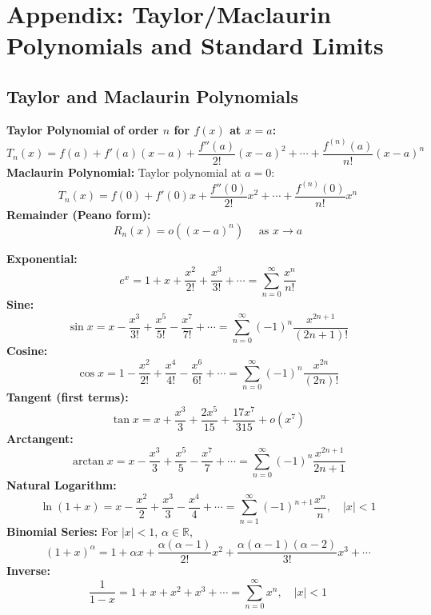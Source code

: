 \section{Appendix: Taylor/Maclaurin Polynomials and Standard Limits}

\subsection{Taylor and Maclaurin Polynomials}

\begin{cascade}
	\textbf{Taylor Polynomial of order $n$ for $f(x)$ at $x=a$:}
	\[
		T_n(x) = f(a) + f'(a)(x-a) + \frac{f''(a)}{2!}(x-a)^2 + \cdots + \frac{f^{(n)}(a)}{n!}(x-a)^n
	\]
	\textbf{Maclaurin Polynomial:} Taylor polynomial at $a=0$:
	\[
		T_n(x) = f(0) + f'(0)x + \frac{f''(0)}{2!}x^2 + \cdots + \frac{f^{(n)}(0)}{n!}x^n
	\]
	\textbf{Remainder (Peano form):}
	\[
		R_n(x) = o((x-a)^n) \quad \text{ as } x \to a
	\]

\end{cascade}

\begin{cascade}
	\textbf{Exponential:}
	\[
		e^x = 1 + x + \frac{x^2}{2!} + \frac{x^3}{3!} + \cdots = \sum_{n=0}^\infty \frac{x^n}{n!}
	\]
	\textbf{Sine:}
	\[
		\sin x = x - \frac{x^3}{3!} + \frac{x^5}{5!} - \frac{x^7}{7!} + \cdots = \sum_{n=0}^\infty (-1)^n \frac{x^{2n+1}}{(2n+1)!}
	\]
	\textbf{Cosine:}
	\[
		\cos x = 1 - \frac{x^2}{2!} + \frac{x^4}{4!} - \frac{x^6}{6!} + \cdots = \sum_{n=0}^\infty (-1)^n \frac{x^{2n}}{(2n)!}
	\]
	\textbf{Tangent (first terms):}
	\[
		\tan x = x + \frac{x^3}{3} + \frac{2x^5}{15} + \frac{17x^7}{315} + o(x^7)
	\]
	\textbf{Arctangent:}
	\[
		\arctan x = x - \frac{x^3}{3} + \frac{x^5}{5} - \frac{x^7}{7} + \cdots = \sum_{n=0}^\infty (-1)^n \frac{x^{2n+1}}{2n+1}
	\]
	\textbf{Natural Logarithm:}
	\[
		\ln(1+x) = x - \frac{x^2}{2} + \frac{x^3}{3} - \frac{x^4}{4} + \cdots = \sum_{n=1}^\infty (-1)^{n+1} \frac{x^n}{n}, \quad |x| < 1
	\]
	\textbf{Binomial Series:} For $|x|<1$, $\alpha \in \mathbb{R}$,
	\[
		(1+x)^\alpha = 1 + \alpha x + \frac{\alpha(\alpha-1)}{2!}x^2 + \frac{\alpha(\alpha-1)(\alpha-2)}{3!}x^3 + \cdots
	\]
	\textbf{Inverse:}
	\[
		\frac{1}{1-x} = 1 + x + x^2 + x^3 + \cdots = \sum_{n=0}^\infty x^n, \quad |x| < 1
	\]
\end{cascade}

